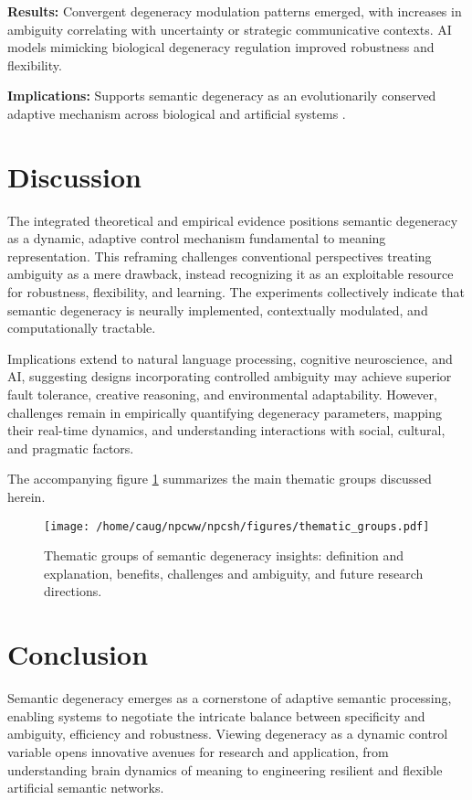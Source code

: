 \documentclass[12pt,a4paper]{article}
\begin{document}
\textbf{Results:} Convergent degeneracy modulation patterns emerged, with increases in ambiguity correlating with uncertainty or strategic communicative contexts. AI models mimicking biological degeneracy regulation improved robustness and flexibility.

\textbf{Implications:} Supports semantic degeneracy as an evolutionarily conserved adaptive mechanism across biological and artificial systems \cite{citation_needed}.

\section{Discussion}

The integrated theoretical and empirical evidence positions semantic degeneracy as a dynamic, adaptive control mechanism fundamental to meaning representation. This reframing challenges conventional perspectives treating ambiguity as a mere drawback, instead recognizing it as an exploitable resource for robustness, flexibility, and learning. The experiments collectively indicate that semantic degeneracy is neurally implemented, contextually modulated, and computationally tractable.

Implications extend to natural language processing, cognitive neuroscience, and AI, suggesting designs incorporating controlled ambiguity may achieve superior fault tolerance, creative reasoning, and environmental adaptability. However, challenges remain in empirically quantifying degeneracy parameters, mapping their real-time dynamics, and understanding interactions with social, cultural, and pragmatic factors.

The accompanying figure \ref{fig:thematic_groups} summarizes the main thematic groups discussed herein.

\begin{figure}[ht]
\centering
\texttt{[image: /home/caug/npcww/npcsh/figures/thematic\_groups.pdf]}
\caption{Thematic groups of semantic degeneracy insights: definition and explanation, benefits, challenges and ambiguity, and future research directions.}
\label{fig:thematic_groups}
\end{figure}

\section{Conclusion}

Semantic degeneracy emerges as a cornerstone of adaptive semantic processing, enabling systems to negotiate the intricate balance between specificity and ambiguity, efficiency and robustness. Viewing degeneracy as a dynamic control variable opens innovative avenues for research and application, from understanding brain dynamics of meaning to engineering resilient and flexible artificial semantic networks.
\end{document}
